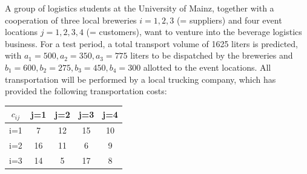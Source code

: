 
A group of logistics students at the University of Mainz, together with a cooperation of three local breweries $i=1,2,3$ (= suppliers) and four event locations $j=1,2,3,4$ (= customers), want to venture into the beverage logistics business.  For a test period, a total transport volume of 1625 liters is predicted, with $a_1=500, a_2=350, a_3=775$ liters to be dispatched by the breweries and $b_1=600, b_2=275, b_3=450, b_4=300$ allotted to the event locations. All transportation will be performed by a local trucking company, which has provided the following transportation costs:
\begin{table}[htbp]
  \centering
    \begin{tabular}{c|cccc}
    $c_{ij}$ & j=1   & j=2   & j=3   & j=4 \\
    \hline
    i=1   & 7     & 12    & 15    & 10 \\
    i=2   & 16    & 11    & 6     & 9 \\
    i=3   & 14    & 5     & 17    & 8  \\
    \end{tabular}
\end{table}

